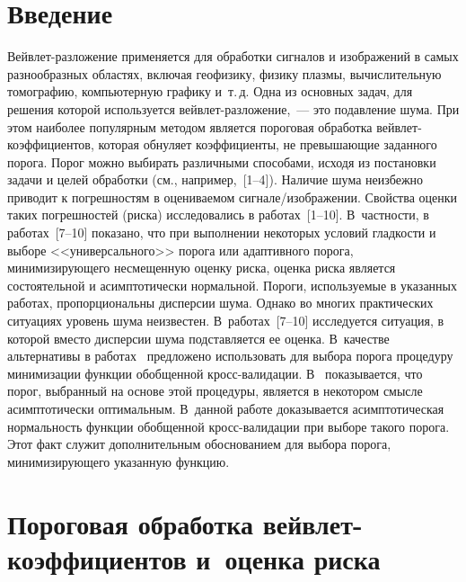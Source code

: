       \begin{multicols}{2}

            \label{st\stat}


\section{Введение}

Вейвлет-разложение применяется для обработки сигналов и изображений в самых разнообразных областях, 
включая геофизику, физику плазмы, вычислительную томографию, компьютерную графику и~т.\,д. 
Одна из основных задач, для решения которой используется вейв\-лет-раз\-ло\-же\-ние,~--- это подавление шума. 
При этом наиболее популярным методом является пороговая обработка вейв\-лет-ко\-эф\-фи\-ци\-ен\-тов, которая 
обнуляет коэффициенты, не превышающие заданного порога. Порог можно выбирать различными способами, исходя из 
постановки задачи и целей обработки (см., например,~[1--4]). Наличие шума неизбежно приводит к погрешностям в 
оцениваемом сиг\-на\-ле/изоб\-ра\-же\-нии. Свойства оценки таких погрешностей (риска) исследовались в работах~[1--10]. 
В~частности, в работах~[7--10] показано, что при выполнении некоторых условий гладкости и выборе  <<универсального>> порога 
или адаптивного порога, минимизирующего несмещенную оценку риска, оценка риска является состоятельной и асимптотически нормальной. 
Пороги, используемые в указанных работах, пропорциональны дисперсии шума. Однако во многих практических ситуациях уровень шума 
неизвестен. В~работах~[7--10] исследуется ситуация, в которой вместо дисперсии шума подставляется ее оценка. 
В~качестве альтернативы в работах~\cite{11-she, 12-she} предложено использовать для выбора порога процедуру минимизации 
функции обобщенной кросс-ва\-ли\-да\-ции. В~\cite{11-she} показывается, что порог, выбранный на основе этой процедуры, 
является в некотором смыс\-ле асимптотически оптимальным. В~данной работе доказывается асимптотическая нормальность функции 
обобщенной кросс-ва\-ли\-да\-ции при выборе такого порога. Этот факт служит дополнительным обоснованием для выбора порога, 
минимизирующего указанную функцию.

\section{Пороговая обработка вейвлет-коэффициентов и~оценка риска}


\end{multicols}
